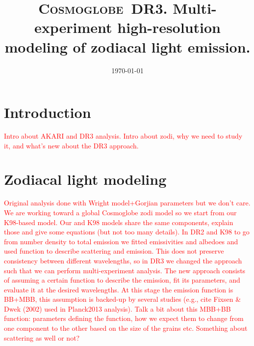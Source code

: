 \documentclass{aa}
\def\Cosmoglobe{\textsc{Cosmoglobe}}
\newcommand{\angela}[0]{\textcolor{red}}
\begin{document}
 

   \title{\bfseries{\Cosmoglobe\ DR3. Multi-experiment high-resolution modeling of zodiacal light emission.}}

   

   \titlerunning{\Cosmoglobe: AKARI reanalysis}

   \date{\today} 
   


   \maketitle

\setcounter{tocdepth}{2}
   
\section{Introduction}

\angela{Intro about AKARI and DR3 analysis.
Intro about zodi, why we need to study it, and what's new about the DR3 approach.}

\section{Zodiacal light modeling}

\angela{Original analysis done with Wright model+Gorjian parameters but we don't care. We are 
working toward a global Cosmoglobe zodi model so we start from our K98-based model.
Our and K98 models share the same components, explain those and give some equations (but not too many details).
In DR2 and K98 to go from number density to total emission we fitted emissivities and albedoes and 
used function to describe scattering and emission. This does not preserve consistency between different 
wavelengths, so in DR3 we changed the approach such that we can perform multi-experiment analysis. 
The new approach consists of assuming a certain function to describe the emission, fit its parameters, 
and evaluate it at the desired wavelengths. At this stage the emission function is BB+MBB, this 
assumption is backed-up by several studies (e.g., cite Fixsen \& Dwek (2002) used in Planck2013 analysis). 
Talk a bit about this MBB+BB function: parameters defining the function, how we expect them to change from 
one component to the other based on the size of the grains etc.
Something about scattering as well or not?}
\end{document}
